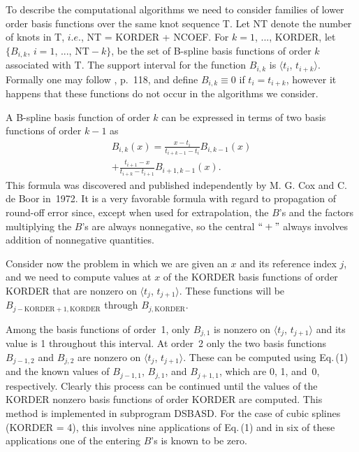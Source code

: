 \documentclass[twoside]{MATH77}
\begin{document}
To describe the computational algorithms we need to consider families of
lower order basis functions over the same knot sequence T.  Let NT denote
the number of knots in T, $i.e.$, NT = KORDER + NCOEF.  For $k = 1$, ...,
KORDER, let $\{B_{i,k}$, $i = 1$, ..., $\text{NT}-k\}$, be the set of
B-spline basis functions of order $k$ associated with T.  The support
interval for the function $B_{i,k}$ is $\langle t_i$, $t_{i+k}\rangle $.
Formally one may follow \cite{deBoor:1978:APG}, p.~118, and define
$B_{i,k} \equiv 0$ if $t_i = t_{i+k}$, however it happens that these
functions do not occur in the algorithms we consider.

A B-spline basis function of order $k$ can be expressed in terms of two
basis functions of order $k-1$ as
\begin{multline}
\label{O1}B_{i,k}(x)=\frac{x-t_i}{t_{i+k-1}-t_i}B_{i,k-1}(x)\\
+\frac{t_{i+1}-x}{t_{i+k}-t_{i+1}}B_{i+1,k-1}(x).
\end{multline}
This formula was discovered and published independently by M. G. Cox and C.
de Boor in~1972. It is a very favorable formula with regard to propagation
of round-off error since, except when used for extrapolation, the $B$'s and
the factors multiplying the $B$'s are always nonnegative,
so the central $``+"$ always involves addition of nonnegative quantities.

Consider now the problem in which we are given an $x$ and its reference
index $j$, and we need to compute values at $x$ of the KORDER basis
functions of order KORDER that are nonzero on $\langle t_j$, $t_{j+1}\rangle $.
These functions will be $B_{j-\text{KORDER}+1,\text{KORDER}}$ through $%
B_{j,\text{KORDER}}.$

Among the basis functions of order~1, only $B_{j,1}$ is nonzero on $\langle
t_j$, $t_{j+1}\rangle $ and its value is 1 throughout this interval. At
order~2 only the two basis functions $B_{j-1,2}$ and $B_{j,2}$ are nonzero
on $\langle t_j$, $t_{j+1}\rangle $. These can be computed using Eq.\,(1) and
the known values of $B_{j-1,1}$, $B_{j,1}$, and $B_{j+1,1}$, which are 0, 1,
and~0, respectively. Clearly this process can be continued until the values
of the KORDER nonzero basis functions of order KORDER are computed. This
method is implemented in subprogram DSBASD. For the case of cubic splines
(KORDER = 4), this involves nine applications of Eq.\,(1) and in six of these
applications one of the entering $B$'s is known to be zero.
\end{document}
